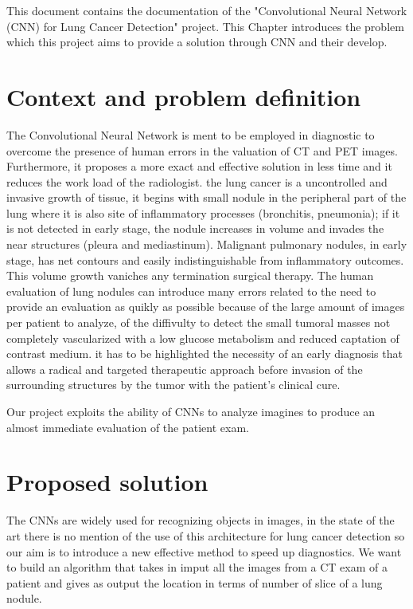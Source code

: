 \documentclass[../main.tex]{subfiles}
\begin{document}
\thispagestyle{empty}
This document contains the documentation of the "Convolutional Neural Network (CNN) for Lung Cancer Detection" project. This Chapter introduces the problem which this project aims to provide a solution through CNN and their develop.

\section{Context and problem definition}
The Convolutional Neural Network is ment to be employed in diagnostic to overcome the presence of human errors in the valuation of CT and PET images. Furthermore, it proposes a more exact and effective solution in less time and it reduces the work load of the radiologist.
the lung cancer is a uncontrolled and invasive growth of tissue, it begins with small nodule in the peripheral part of the lung where it is also site of inflammatory processes (bronchitis, pneumonia); if it is not detected in early stage, the nodule increases in volume and invades the near structures (pleura and mediastinum). Malignant pulmonary nodules, in early stage, has net contours and easily indistinguishable from inflammatory outcomes. This volume growth vaniches any termination surgical therapy.
The human evaluation of lung nodules can introduce many errors related to the need to provide an evaluation as quikly as possible because of the large amount of images per patient to analyze, of the diffivulty to detect the small tumoral masses not completely vascularized with a low glucose metabolism and reduced captation of contrast medium.
it has to be highlighted the necessity of an early diagnosis that allows a radical and targeted therapeutic approach before invasion of the  surrounding structures by the tumor with the patient's clinical cure.
\vspace{5mm}

Our project exploits the ability of CNNs to analyze imagines to produce an almost immediate evaluation of the patient exam.

\section{Proposed solution}
The CNNs are widely used for recognizing objects in images, in the state of the art there is no mention of the use of this architecture for lung cancer detection so our aim is to introduce a new effective method to speed up diagnostics.
We want to build an algorithm that takes in imput all the images from a CT exam of a patient and gives as output the location in terms of number of slice of a lung nodule.
\end{document}
